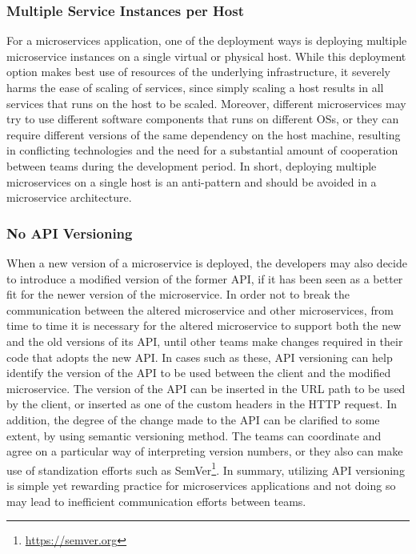 \documentclass{Configuration_Files/PoliMi3i_thesis}
\begin{document}
\subsubsection{Multiple Service Instances per Host}
\label{subsubsec:multiple_service_per_host}

For a microservices application, one of the deployment ways is deploying multiple microservice instances on a single virtual or physical host.
While this deployment option makes best use of resources of the underlying infrastructure, it severely harms the ease of scaling of services, since simply scaling a host results in all services that runs on the host to be scaled.
Moreover, different microservices may try to use different software components that runs on different OSs, or they can require different versions of the same dependency on the host machine, resulting in conflicting technologies and the need for a substantial amount of cooperation between teams during the development period.
In short, deploying multiple microservices on a single host is an anti-pattern and should be avoided in a microservice architecture.

\subsubsection{No API Versioning}
\label{subsubsec:no_api_versioning}

When a new version of a microservice is deployed, the developers may also decide to introduce a modified version of the former API, if it has been seen as a better fit for the newer version of the microservice.
In order not to break the communication between the altered microservice and other microservices, from time to time it is necessary for the altered microservice to support both the new and the old versions of its API, until other teams make changes required in their code that adopts the new API.
In cases such as these, API versioning can help identify the version of the API to be used between the client and the modified microservice.
The version of the API can be inserted in the URL path to be used by the client, or inserted as one of the custom headers in the HTTP request.
In addition, the degree of the change made to the API can be clarified to some extent, by using semantic versioning method.
The teams can coordinate and agree on a particular way of interpreting version numbers, or they also can make use of standization efforts such as SemVer\footnote{\href{https://semver.org}{https://semver.org}}.
In summary, utilizing API versioning is simple yet rewarding practice for microservices applications and not doing so may lead to inefficient communication efforts between teams.
\end{document}
